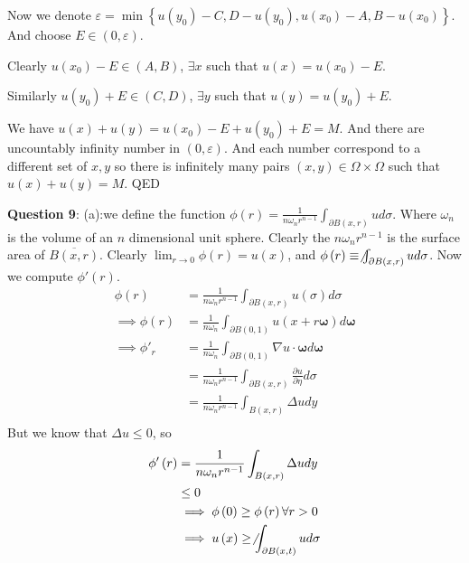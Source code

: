 \documentclass[a4paper]{article}
\theoremstyle{definition}
\begin{document}
	Now we denote $\varepsilon=\min\left\{ u\left( y_0 \right) -C,D-u\left( y_0 \right) ,u\left( x_0 \right) -A,B-u\left( x_0 \right)  \right\} $. And choose $E\in (0,\varepsilon)$. 

	Clearly $u\left( x_0 \right) -E\in \left( A,B \right) $, $\exists x$ such that $u\left( x \right) =u\left( x_0 \right) -E$. 

	Similarly $u\left( y_0 \right) +E\in \left( C,D \right) $, $\exists y$ such that $u\left( y \right) =u\left( y_0 \right) +E$. 

	We have $u\left( x \right) +u\left( y \right) =u\left( x_0 \right) -E+u\left( y_0 \right) +E=M$. And there are uncountably infinity number in $\left( 0,\varepsilon \right) $. And each number correspond to a different set of $x,y$ so there is infinitely many pairs $\left( x,y \right) \in \Omega\times \Omega$ such that $u\left( x \right) +u\left( y \right) =M$. QED

	\textbf{Question 9}: (a):we define the function $\phi\left( r \right) =\frac{1}{n\omega_nr^{n-1}}\int_{\partial B\left( x,r \right) }u d\sigma$. Where $\omega_n$ is the volume of an $n$ dimensional unit sphere. Clearly the $n\omega_n r^{n-1} $ is the surface area of $\overline{B\left( x,r \right) }$. Clearly $\lim_{r \to 0} \phi\left( r \right) =u\left( x \right) $, and $\phi\left( r \right)  \equiv \not\int_{\partial B\left( x,r \right) }ud\sigma$. Now we compute $\phi'\left( r \right) $. 
	\begin{align*}
		\phi\left( r \right) &=\frac{1}{n\omega_n r^{n-1}}\int_{\partial B\left( x,r \right) }u\left( \sigma \right) d\sigma\\
		\implies \phi\left( r \right) &= \frac{1}{n\omega_n}\int_{\partial B\left( 0,1 \right) }u\left( x+r\mathbf{ \omega} \right) d\mathbf{ \omega} \\
		\implies \phi'_r&= \frac{1}{n\omega_n}\int_{\partial B\left( 0,1 \right) }\nabla u\cdot\mathbf{ \omega}d\mathbf{ \omega} \\
		&= \frac{1}{n\omega_n r^{n-1}}\int_{\partial B\left( x,r \right) }^{} \frac{\partial u}{\partial \eta} d\sigma  \\
		&= \frac{1}{n\omega_nr^{n-1}}\int_{B\left( x,r \right) }^{} \Delta u dy  \\
	\end{align*} 
	But we know that $\Delta u \le 0$, so 
	\begin{align*}
		\phi'\left( r \right) &= \frac{1}{n\omega_n r^{n-1}}\int_{B\left( x,r \right) }\Delta u dy\\
		&\le 0\\
		&\implies \phi\left( 0 \right) \ge \phi\left( r \right) \forall r>0\\
		&\implies u\left( x \right) \ge \not\int_{\partial B\left( x,t \right) }ud\sigma
	\end{align*} 
	
\end{document}
